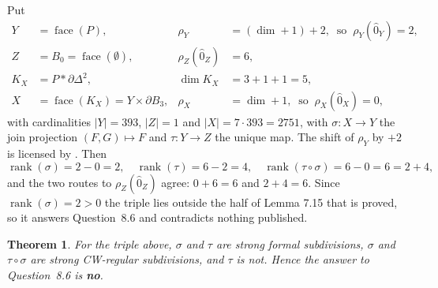 \documentclass[11pt]{amsart}
\newtheorem{theorem}{Theorem}
\theoremstyle{definition}
\theoremstyle{remark}
\DeclareMathOperator{\rank}{rank}
\newcommand{\face}{\operatorname{face}}
\newcommand{\Ohat}{\widehat{0}}
\newcommand{\bd}{\partial}
\newcommand{\join}{*}
\begin{document}
Put
\begin{align*}
 Y&=\face(P), & \rho_Y&=(\dim{}+1)+2,\ \text{ so }\ \rho_Y(\Ohat_Y)=2,\\
 Z&=B_0=\face(\emptyset), & \rho_Z(\Ohat_Z)&=6,\\
 K_X&=P\join\bd\Delta^2, & \dim K_X&=3+1+1=5,\\
 X&=\face(K_X)=Y\times\bd B_3, & \rho_X&=\dim{}+1,\ \text{ so }\ \rho_X(\Ohat_X)=0,
\end{align*}
with cardinalities $|Y|=393$, $|Z|=1$ and $|X|=7\cdot393=2751$, with
$\sigma\colon X\to Y$ the join projection $(F,G)\mapsto F$ and $\tau\colon Y\to Z$
the unique map. The shift of $\rho_Y$ by $+2$ is licensed by
\cite[Example 3.4]{Stapledon}. Then
\[
 \rank(\sigma)=2-0=2,\quad \rank(\tau)=6-2=4,\quad \rank(\tau\circ\sigma)=6-0=6=2+4 ,
\]
and the two routes to $\rho_Z(\Ohat_Z)$ agree: $0+6=6$ and $2+4=6$. Since
$\rank(\sigma)=2>0$ the triple lies outside the half of Lemma 7.15 that is proved, so it
answers Question~8.6 and contradicts nothing published.

\begin{theorem}\label{thm:main}
For the triple above, $\sigma$ and $\tau$ are strong formal subdivisions, $\sigma$ and
$\tau\circ\sigma$ are strong CW-regular subdivisions, and $\tau$ is not. Hence the
answer to Question~8.6 is \textbf{no}.
\end{theorem}
\end{document}
